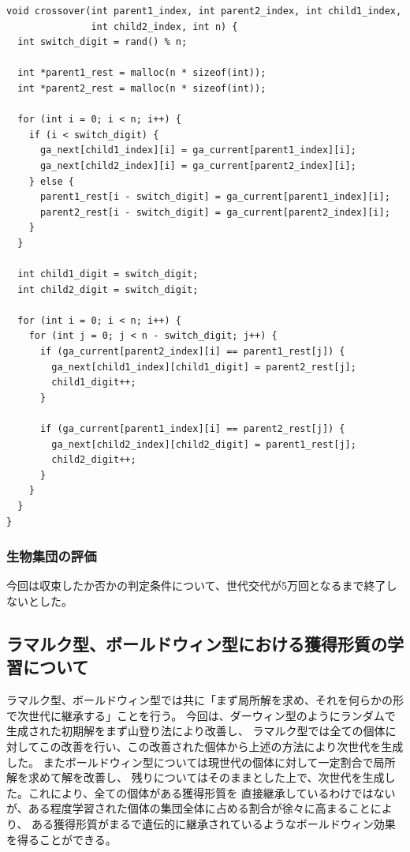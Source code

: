 \documentclass[uplatex]{jsarticle}
\begin{document}
\begin{lstlisting}[basicstyle=\ttfamily\footnotesize, frame=single]
void crossover(int parent1_index, int parent2_index, int child1_index,
               int child2_index, int n) {
  int switch_digit = rand() % n;

  int *parent1_rest = malloc(n * sizeof(int));
  int *parent2_rest = malloc(n * sizeof(int));

  for (int i = 0; i < n; i++) {
    if (i < switch_digit) {
      ga_next[child1_index][i] = ga_current[parent1_index][i];
      ga_next[child2_index][i] = ga_current[parent2_index][i];
    } else {
      parent1_rest[i - switch_digit] = ga_current[parent1_index][i];
      parent2_rest[i - switch_digit] = ga_current[parent2_index][i];
    }
  }

  int child1_digit = switch_digit;
  int child2_digit = switch_digit;

  for (int i = 0; i < n; i++) {
    for (int j = 0; j < n - switch_digit; j++) {
      if (ga_current[parent2_index][i] == parent1_rest[j]) {
        ga_next[child1_index][child1_digit] = parent2_rest[j];
        child1_digit++;
      }

      if (ga_current[parent1_index][i] == parent2_rest[j]) {
        ga_next[child2_index][child2_digit] = parent1_rest[j];
        child2_digit++;
      }
    }
  }
}
\end{lstlisting}


\subsubsection{生物集団の評価}
今回は収束したか否かの判定条件について、世代交代が5万回となるまで終了しないとした。

\subsection{ラマルク型、ボールドウィン型における獲得形質の学習について}
ラマルク型、ボールドウィン型では共に「まず局所解を求め、それを何らかの形で次世代に継承する」ことを行う。
今回は、ダーウィン型のようにランダムで生成された初期解をまず山登り法により改善し、
ラマルク型では全ての個体に対してこの改善を行い、この改善された個体から上述の方法により次世代を生成した。
またボールドウィン型については現世代の個体に対して一定割合で局所解を求めて解を改善し、
残りについてはそのままとした上で、次世代を生成した。これにより、全ての個体がある獲得形質を
直接継承しているわけではないが、ある程度学習された個体の集団全体に占める割合が徐々に高まることにより、
ある獲得形質がまるで遺伝的に継承されているようなボールドウィン効果を得ることができる。
\end{document}
